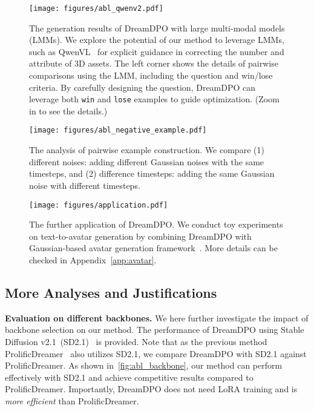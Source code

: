 \begin{figure*}[t]
    \centering
    \texttt{[image: figures/abl\_qwenv2.pdf]}
    \caption{
    The generation results of DreamDPO with large multi-modal models (LMMs).
    We explore the potential of our method to leverage LMMs, such as QwenVL~\protect\citep{bai2023qwen} for explicit guidance in correcting the number and attribute of 3D assets. The left corner shows the details of pairwise comparisons using the LMM, including the question and win/lose criteria.
    By carefully designing the question, DreamDPO can leverage both \texttt{win} and \texttt{lose} examples to guide optimization. (Zoom in to see the details.)
    }
    \label{fig:abl_qwenv2}
\end{figure*}


\begin{figure}[t]
  \centering
  \begin{minipage}{0.5\textwidth}
    \centering
    \texttt{[image: figures/abl\_negative\_example.pdf]}
    \caption{The analysis of pairwise example construction.
    We compare (1) different noises: adding different Gaussian noises with the same timesteps, and (2) difference timesteps: adding the same Gaussian noise with different timesteps.}
    \label{fig:abl_negative_example}
  \end{minipage}\hfill
  \begin{minipage}{0.48\textwidth}
    \centering
    \texttt{[image: figures/application.pdf]}
    \caption{The further application of DreamDPO.
    We conduct toy experiments on text-to-avatar generation by combining DreamDPO with Gaussian-based avatar generation framework~\citep{zhou2024headstudio}. More details can be checked in Appendix~\ref{app:avatar}.}
    \label{fig:application}
  \end{minipage}
\end{figure}


\subsection{More Analyses and Justifications}\label{sec:refined_analysis}


\textbf{Evaluation on different backbones. }
We here further investigate the impact of backbone selection on our method. The performance of DreamDPO using Stable Diffusion v2.1~(SD2.1)~\citep{rombach2022high} is provided. Note that as the previous method ProlificDreamer~\citep{wang2023prolificdreamer} also utilizes SD2.1, we compare DreamDPO with SD2.1 against ProlificDreamer. As shown in~\cref{fig:abl_backbone}, our method can perform effectively with SD2.1 and achieve competitive results compared to ProlificDreamer. Importantly, DreamDPO does not need LoRA training and is \textit{more efficient} than ProlificDreamer. 



